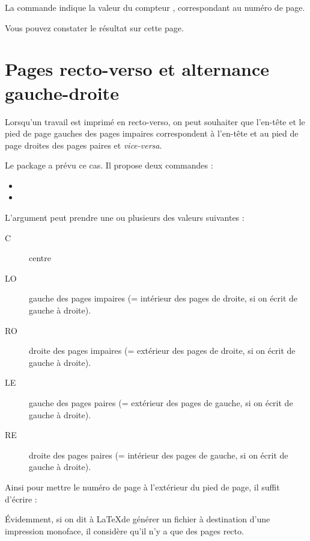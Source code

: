 La commande  indique la valeur du compteur , correspondant au numéro de page.

Vous pouvez constater le résultat sur cette page.\thispagestyle{fancy}\cfoot{{\thepage} / \ref{TotPages}} \renewcommand{\headrulewidth}{0pt}
\fancyhead[LE,RO]{}
\fancyhead[RE]{\leftmark}
\fancyhead[LO]{\rightmark}

\section{Pages recto-verso et alternance gauche-droite}

Lorsqu'un travail est imprimé en recto-verso, on peut souhaiter que l'en-tête et le pied de page gauches des pages impaires correspondent à l'en-tête et au pied de page droites des pages paires et \emph{vice-versa}.

Le package  a prévu ce cas. Il propose deux commandes : 
\begin{itemize}
\item {}
\item {}
\end{itemize}

L'argument  peut prendre une ou plusieurs des valeurs suivantes :
\begin{description}
\item[C] centre
\item[LO] gauche des pages impaires (= intérieur des pages de droite, si on écrit de gauche à droite).
\item[RO] droite des pages impaires (= extérieur des pages de droite, si on écrit de gauche à droite).
\item[LE] gauche des pages paires (= extérieur des pages  de gauche, si on écrit de gauche à droite).
\item[RE] droite des pages paires (= intérieur des pages de gauche, si on écrit de gauche à droite).
\end{description}

Ainsi pour mettre le numéro de page à l'extérieur du pied de page, il suffit d'écrire :

\begin{latexcode}
\fancyfoot[LE,RO]{\thepage}
\end{latexcode}

Évidemment, si on dit à \LaTeX de générer un fichier à destination d'une impression monoface, il considère qu'il n'y a que des pages recto.

